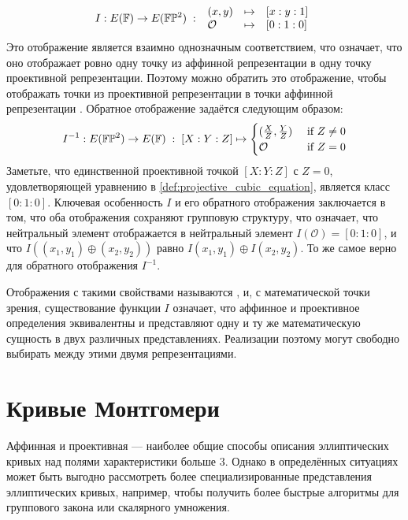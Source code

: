 \begin{equation}\label{eq:weierstrass-isomorphism-map}
I : E(\mathbb{F}) \to E(\mathbb{F}\mathbb{P}^2)\;:\;
\begin{array}{lcl}
(x,y)       &\mapsto & [x:y:1]\\
\mathcal{O} &\mapsto & [0:1:0]
\end{array}
\end{equation}
Это отображение является взаимно однозначным соответствием, что означает, что оно отображает ровно одну точку из аффинной репрезентации в одну точку проективной репрезентации. Поэтому можно обратить это отображение, чтобы отображать точки из проективной репрезентации в точки аффинной репрезентации . Обратное отображение задаётся следующим образом:
\begin{equation}
I^{-1} : E(\mathbb{F}\mathbb{P}^2)\to E(\mathbb{F}) \;:\; [X:Y:Z] \mapsto \begin{cases}
(\frac{X}{Z},\frac{Y}{Z}) & \text{ if } Z\neq 0\\
\mathcal{O} & \text{ if } Z=0
\end{cases}
\end{equation}
Заметьте, что единственной проективной точкой $[X:Y:Z]$ с $Z = 0$, удовлетворяющей уравнению в \ref{def:projective_cubic_equation}, является класс $[0:1:0]$. Ключевая особенность $I$ и его обратного отображения заключается в том, что оба отображения сохраняют групповую структуру, что означает, что нейтральный элемент отображается в нейтральный элемент $I(\mathcal{O})=[0:1:0]$, и что $I((x_1,y_1)\oplus (x_2,y_2))$ равно $I(x_1,y_1)\oplus I(x_2,y_2)$. То же самое верно для обратного отображения $I^{-1}$.

Отображения с такими свойствами называются , и, с математической точки зрения, существование функции $I$ означает, что аффинное и проективное определения  эквивалентны и представляют одну и ту же математическую сущность в двух различных представлениях. Реализации поэтому могут свободно выбирать между этими двумя репрезентациями. 


\section{Кривые Монтгомери}\label{sec:montgomery}
Аффинная и проективная  — наиболее общие способы описания эллиптических кривых над полями характеристики больше $3$. Однако в определённых ситуациях может быть выгодно рассмотреть более специализированные представления эллиптических кривых, например, чтобы получить более быстрые алгоритмы для группового закона или скалярного умножения. 

